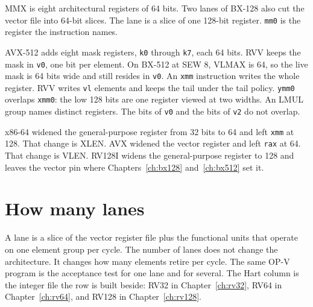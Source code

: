 MMX is eight architectural registers of 64 bits. Two lanes of BX-128 also cut the vector file into 64-bit slices. The lane is a slice of one 128-bit register. \texttt{mm0} is the register the instruction names.

AVX-512 adds eight mask registers, \texttt{k0} through \texttt{k7}, each 64 bits. RVV keeps the mask in \texttt{v0}, one bit per element. On BX-512 at SEW 8, VLMAX is 64, so the live mask is 64 bits wide and still resides in \texttt{v0}. An \texttt{xmm} instruction writes the whole register. RVV writes \texttt{vl} elements and keeps the tail under the tail policy. \texttt{ymm0} overlaps \texttt{xmm0}: the low 128 bits are one register viewed at two widths. An LMUL group names distinct registers. The bits of \texttt{v0} and the bits of \texttt{v2} do not overlap.

x86-64 widened the general-purpose register from 32 bits to 64 and left \texttt{xmm} at 128. That change is XLEN. AVX widened the vector register and left \texttt{rax} at 64. That change is VLEN. RV128I widens the general-purpose register to 128 and leaves the vector pin where Chapters~\ref{ch:bx128} and~\ref{ch:bx512} set it.

\section{How many lanes}
\label{sec:lanes}

A lane is a slice of the vector register file plus the functional units that operate on one element group per cycle. The number of lanes does not change the architecture. It changes how many elements retire per cycle. The same OP-V program is the acceptance test for one lane and for several. The Hart column is the integer file the row is built beside: RV32 in Chapter~\ref{ch:rv32}, RV64 in Chapter~\ref{ch:rv64}, and RV128 in Chapter~\ref{ch:rv128}.

